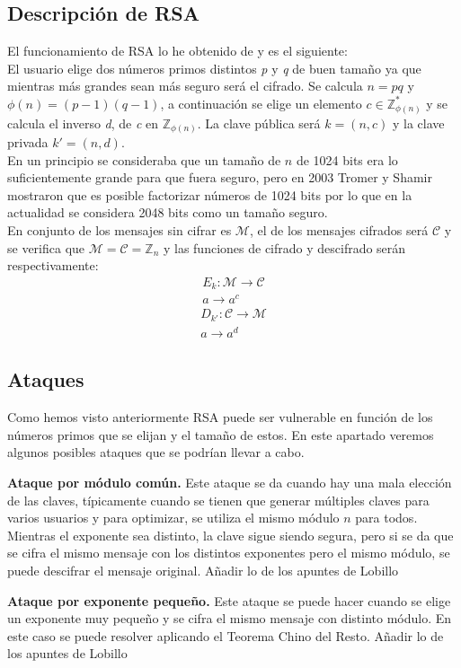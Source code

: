 \subsection{Descripción de RSA}
El funcionamiento de RSA lo he obtenido de \cite{angelRiosMateos} y es el siguiente:\\
El usuario elige dos números primos distintos \emph{p} y \emph{q} de buen tamaño ya que mientras más grandes sean más seguro será el cifrado.
Se calcula $n = pq$ y $\phi(n) = (p-1)(q-1)$, a continuación se elige un elemento $c \in \mathbb{Z}_{\phi(n)}^*$ y se calcula el inverso \emph{d}, de \emph{c} en $\mathbb{Z}_{\phi(n)}$. La clave pública será $k=(n,c)$ y la clave privada $k'=(n,d)$.\\
En un principio se consideraba que un tamaño de $n$ de 1024 bits era lo suficientemente grande para que fuera seguro, pero en 2003 Tromer y Shamir mostraron que es posible factorizar números de 1024 bits \cite{1024RSA} por lo que en la actualidad se considera 2048 bits como un tamaño seguro.\\
En conjunto de los mensajes sin cifrar es $\mathcal{M}$, el de los mensajes cifrados será $\mathcal{C}$ y se verifica que $\mathcal{M} = \mathcal{C} = \mathbb{Z}_n$ y las funciones de cifrado y descifrado serán respectivamente:
\begin{align*}
	E_{k}:\mathcal{M}\rightarrow\mathcal{C}\\
	a \rightarrow a^c
\end{align*}
\begin{align*}
	D_{k'}:\mathcal{C}\rightarrow\mathcal{M}\\
	a \rightarrow a^d
\end{align*}

\subsection{Ataques}
Como hemos visto anteriormente RSA puede ser vulnerable en función de los números primos que se elijan y el tamaño de estos. En este apartado veremos algunos posibles ataques que se podrían llevar a cabo.
\begin{description}
	\item \textbf{Ataque por módulo común.} Este ataque se da cuando hay una mala elección de las claves, típicamente cuando se tienen que generar múltiples claves para varios usuarios y para optimizar, se utiliza el mismo módulo $n$ para todos. Mientras el exponente sea distinto, la clave sigue siendo segura, pero si se da que se cifra el mismo mensaje con los distintos exponentes pero el mismo módulo, se puede descifrar el mensaje original. Añadir lo de los apuntes de Lobillo
	\item \textbf{Ataque por exponente pequeño.} Este ataque se puede hacer cuando se elige un exponente muy pequeño y se cifra el mismo mensaje con distinto módulo. En este caso se puede resolver aplicando el Teorema Chino del Resto. Añadir lo de los apuntes de Lobillo
\end{description}
